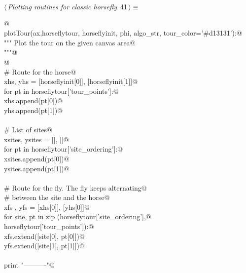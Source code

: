 \documentclass[11.5pt]{report}
\begin{document}
\begin{flushleft} \small\label{scrap41}\raggedright\small
{} $\langle\,${\itshape Plotting routines for classic horsefly}\nobreak\ {\footnotesize {41}}$\,\rangle\equiv$
\vspace{-1ex}
\begin{list}{}{} \item
\mbox{}\verb@ @\\
\mbox{}\verb@def plotTour(ax,horseflytour, horseflyinit, phi, algo_str, tour_color='#d13131'):@\\
\mbox{}\verb@    """ Plot the tour on the given canvas area@\\
\mbox{}\verb@    """@\\
\mbox{}\verb@   @\\
\mbox{}\verb@    # Route for the horse@\\
\mbox{}\verb@    xhs, yhs = [horseflyinit[0]], [horseflyinit[1]]@\\
\mbox{}\verb@    for pt in horseflytour['tour_points']:@\\
\mbox{}\verb@        xhs.append(pt[0])@\\
\mbox{}\verb@        yhs.append(pt[1])@\\
\mbox{}\verb@@\\
\mbox{}\verb@    # List of sites@\\
\mbox{}\verb@    xsites, ysites = [], []@\\
\mbox{}\verb@    for pt in horseflytour['site_ordering']:@\\
\mbox{}\verb@        xsites.append(pt[0])@\\
\mbox{}\verb@        ysites.append(pt[1])@\\
\mbox{}\verb@@\\
\mbox{}\verb@    # Route for the fly. The fly keeps alternating@\\
\mbox{}\verb@    # between the site and the horse@\\
\mbox{}\verb@    xfs , yfs = [xhs[0]], [yhs[0]]@\\
\mbox{}\verb@    for site, pt in zip (horseflytour['site_ordering'],@\\
\mbox{}\verb@                         horseflytour['tour_points']):@\\
\mbox{}\verb@        xfs.extend([site[0], pt[0]])@\\
\mbox{}\verb@        yfs.extend([site[1], pt[1]])@\\
\mbox{}\verb@@\\
\mbox{}\verb@    print "\n----------"@\\

\end{list}
\end{flushleft}
\end{document}
